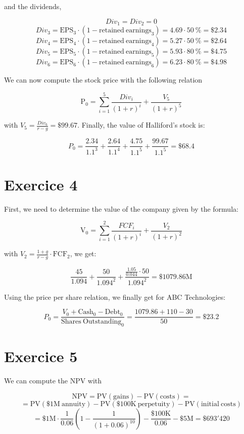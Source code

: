 \documentclass[a4paper,11pt,twoside]{article}
\def \be {\begin{equation}}
\def \ee {\end{equation}}
\begin{document}
and the dividends,

\be
Div_1 = Div_2 = 0
\ee
\be
Div_3 = \mathrm{EPS_3} \cdot (1 - \mathrm{retained\ earnings}_3) = 4.69 \cdot 50\ \% = \$ 2.34
\ee
\be
Div_4 = \mathrm{EPS_4} \cdot (1 - \mathrm{retained\ earnings}_4) = 5.27 \cdot 50\ \% = \$ 2.64
\ee
\be
Div_5 = \mathrm{EPS_5} \cdot (1 - \mathrm{retained\ earnings}_5) = 5.93 \cdot 80\ \% = \$ 4.75
\ee
\be
Div_6 = \mathrm{EPS_6} \cdot (1 - \mathrm{retained\ earnings}_6) = 6.23 \cdot 80\ \% = \$ 4.98
\ee

We can now compute the stock price with the following relation

\be
\mathrm{P_0}=\sum\limits_{i=1}^5 \frac{Div_i}{(1+r)^{i}} + \frac{V_5}{(1+r)^5} 
\ee

with $V_5=\frac{Div_6}{r-g}=\$99.67$. Finally, the value of Halliford's stock is:

\be
P_0 = \frac{2.34}{1.1^3} + \frac{2.64}{1.1^4} + \frac{4.75}{1.1^5} + \frac{99.67}{1.1^5} = \$ 68.4
\ee

\section*{Exercice 4}

First, we need to determine the value of the company given by the formula:

\be
\mathrm{V_0}=\sum\limits_{i=1}^2 \frac{FCF_i}{(1+r)^{i}} + \frac{V_2}{(1+r)^2} 
\ee

with $V_2=\frac{1+g}{r-g} \cdot \mathrm{FCF_2}$, we get:

\be
\frac{45}{1.094} + \frac{50}{1.094^2} + \frac{\frac{1.05}{0.044} \cdot 50}{1.094^2} = \$ 1079.86 \mathrm{M}
\ee

Using the price per share relation, we finally get for ABC Technologies:

\be
P_0 = \frac{V_0 + \mathrm{Cash}_0 - \mathrm{Debt}_0}{ \mathrm{Shares\ Outstanding}_0} =\frac{1079.86 + 110 - 30}{50} = \$ 23.2
\ee

\section*{Exercice 5}

We can compute the NPV with

\be
\mathrm{NPV}=\mathrm{PV(gains)}-\mathrm{PV(costs)}=
\ee
\be
= \mathrm{PV}(\mathrm{\$1M\ annuity}) - \mathrm{PV}(\mathrm{\$100K\ perpetuity}) - \mathrm{PV}(\mathrm{initial\ costs}) 
\ee
\be
=\$1\mathrm{M} \cdot \frac{1}{0.06} \left( 1 - \frac{1}{(1 + 0.06)^{10}} \right) - \frac{\$100\mathrm{K}}{0.06} - \$5\mathrm{M} = \$ 693'420
\ee
\end{document}
